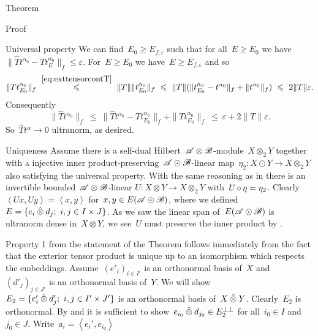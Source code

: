 \documentclass[b]{subfiles}
\begin{document}
\begin{parsec}
\begin{point}{Theorem}
\begin{point}{Proof}
\begin{point}{Universal property}
We can find~$E_0 \geq E_{f,\varepsilon}$
such that for all~$E \geq E_0$
we have~$\| \hat{T} t^{\alpha_0} -T t^{\alpha_0}_E \|_f \leq \varepsilon$.
For~$E \geq E_0$ we have~$E \geq E_{f,\varepsilon}$ and so
\begin{equation*}
 \|T t^{\alpha_0}_{E_0}\|_f
 \  \overset{\eqref{eq:exttensorcontT}}{\leq}\  \|T\| \|t^{\alpha_0}_{E_0}\|_f
  \  \leq\ \|T\|
  ( \|t^{\alpha_0}_{E_0} - t^{\alpha_0}\|_f +
  \| t^{\alpha_0} \|_f)
   \ \leq\  2 \|T\| \varepsilon.
\end{equation*}
    Consequently
\begin{equation*}
    \|\hat{T} t^{\alpha_0} \|_f \ \leq  \ 
    \|\hat{T} t^{\alpha_0} - T t^{\alpha_0}_{E_0} \|_f
                + \|T t^{\alpha_0}_{E_0}\|_f
    \ \leq\  \varepsilon + 2\|T\|\varepsilon.
\end{equation*}
So~$\hat{T}t^\alpha \to 0$ ultranorm, as desired.
\end{point}
\begin{point}[ext-tensor-uniqueness]{Uniqueness}%
Assume there is a self-dual Hilbert~$\scrA\otimes\scrB$-module~$X \otimes_2 Y$
    together with a injective
    inner product-preserving~$\scrA\odot\scrB$-linear
    map~$\eta_2 \colon X \odot Y \to X \otimes_2 Y$
    also satisfying the universal property.
With the same reasoning as in 
    there is an invertible bounded~$\scrA\otimes\scrB$-linear
    $U\colon X \otimes Y \to X \otimes_2 Y$
    with~$U \after \eta = \eta_2$.
Clearly~$\left<Ux, U y\right> = \left<x,y\right>$
    for~$x,y \in E (\scrA\odot\scrB)$,
    where we defined~$E = \{e_i \hotimes d_j; \ i,j \in I\times J\}$.
As we saw the linear span of~$E (\scrA\odot\scrB)$
    is ultranorm dense in~$X \otimes Y$,
    we see~$U$ must preserve the inner product by .
\end{point}
\begin{point}%
Property 1 from the statement of the Theorem follows immediately
    from the fact that the exterior tensor product is unique
    up to an isomorphism which respects the embeddings.
Assume~$(e'_i)_{i \in I'}$ is an orthonormal basis of~$X$
    and~$(d'_j)_{j \in J'}$ is an orthonormal basis of~$Y$.
We will show $E_2 =\{ e'_i \hotimes d'_j; \ i,j \in I'\times J'\}$
is an orthonormal basis of~$X \hotimes Y$.
Clearly~$E_2$ is orthonormal.
By  and 
    it is sufficient to show~$e_{i_0} \hotimes d_{j_0} \in E_2^{\perp\perp}$
    for all~$i_0 \in I$ and $j_0 \in J$.
Write~$a_i = \left<e_i',e_{i_0}\right>$

\end{point}
\end{point}
\end{point}
\end{parsec}
\end{document}
